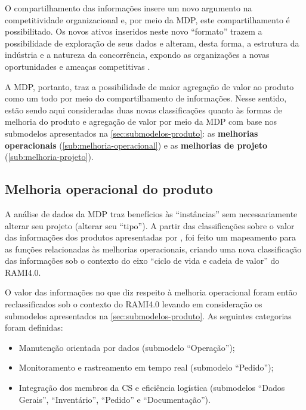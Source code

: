 O compartilhamento das informações insere um novo argumento na competitividade organizacional \cite{framling2013plm} e, por meio da MDP, este compartilhamento é possibilitado. Os novos ativos inseridos neste novo ``formato'' trazem a possibilidade de exploração de seus dados e alteram, desta forma, a estrutura da indústria e a natureza da concorrência, expondo as organizações a novas oportunidades e ameaças competitivas \cite{porter2015smartproducts}.

A MDP, portanto, traz a possibilidade de maior agregação de valor ao produto como um todo por meio do compartilhamento de informações. Nesse sentido, estão sendo aqui consideradas duas novas classificações quanto às formas de melhoria do produto e agregação de valor por meio da MDP com base nos submodelos apresentados na \autoref{sec:submodelos-produto}: as \textbf{melhorias operacionais} (\autoref{sub:melhoria-operacional}) e as \textbf{melhorias de projeto} (\autoref{sub:melhoria-projeto}).

\subsection{Melhoria operacional do produto}
\label{sub:melhoria-operacional}

A análise de dados da MDP traz benefícios às ``instâncias'' sem necessariamente alterar seu projeto (alterar seu ``tipo''). A partir das classificações sobre o valor das informações dos produtos apresentadas por , foi feito um mapeamento para as funções relacionadas às melhorias operacionais, criando uma nova classificação das informações sob o contexto do eixo ``ciclo de vida e cadeia de valor'' do RAMI4.0.

O valor das informações no que diz respeito à melhoria operacional foram então reclassificados sob o contexto do RAMI4.0 levando em consideração os submodelos apresentados na \autoref{sec:submodelos-produto}. As seguintes categorias foram definidas:

\begin{itemize}
	\item Manutenção orientada por dados (submodelo ``Operação'');
	\item Monitoramento e rastreamento em tempo real (submodelo ``Pedido'');
	\item Integração dos membros da CS e eficiência logística (submodelos ``Dados Gerais'', ``Inventário'', ``Pedido'' e ``Documentação'').
\end{itemize}

